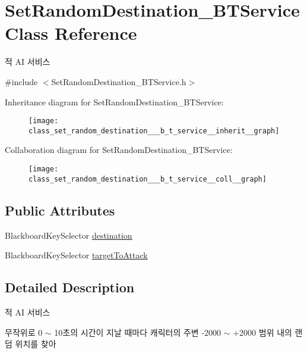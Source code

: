 \hypertarget{class_set_random_destination___b_t_service}{}\section{Set\+Random\+Destination\+\_\+\+B\+T\+Service Class Reference}
\label{class_set_random_destination___b_t_service}


적 AI 서비스  




{\ttfamily \#include $<$Set\+Random\+Destination\+\_\+\+B\+T\+Service.\+h$>$}



Inheritance diagram for Set\+Random\+Destination\+\_\+\+B\+T\+Service\+:
\nopagebreak
\begin{figure}[H]
\begin{center}
\leavevmode
\texttt{[image: class\_set\_random\_destination\_\_\_b\_t\_service\_\_inherit\_\_graph]}
\end{center}
\end{figure}


Collaboration diagram for Set\+Random\+Destination\+\_\+\+B\+T\+Service\+:
\nopagebreak
\begin{figure}[H]
\begin{center}
\leavevmode
\texttt{[image: class\_set\_random\_destination\_\_\_b\_t\_service\_\_coll\_\_graph]}
\end{center}
\end{figure}
\subsection*{Public Attributes}
\begin{DoxyCompactItemize}
\item 
Blackboard\+Key\+Selector \hyperlink{class_set_random_destination___b_t_service_ab259c7024b387a7320ea85e5df8d7016}{destination}
\item 
Blackboard\+Key\+Selector \hyperlink{class_set_random_destination___b_t_service_a6c67414130286ac84e546e73af226b2c}{target\+To\+Attack}
\end{DoxyCompactItemize}


\subsection{Detailed Description}
적 AI 서비스 

무작위로 0 $\sim$ 10초의 시간이 지날 때마다 캐릭터의 주변 -\/2000 $\sim$ +2000 범위 내의 랜덤 위치를 찾아

